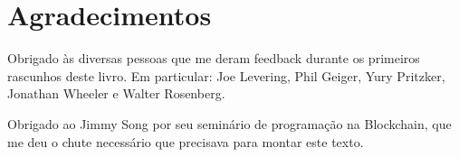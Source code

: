 \chapter*{Agradecimentos}
\label{ch:agracedimentos}

Obrigado às diversas pessoas que me deram feedback durante os primeiros rascunhos deste livro. Em particular: Joe Levering, Phil Geiger, Yury Pritzker, Jonathan Wheeler e Walter Rosenberg.

Obrigado ao Jimmy Song por seu seminário de programação na Blockchain, que me deu o chute necessário que  precisava para montar este texto.